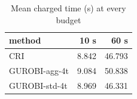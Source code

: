 \begin{table}[htbp]
\centering
\small
\caption{Mean charged time (s) at every budget}
\label{tab:E7_gurobi_threads_time_by_budget}
\begin{tabular}{lrr}
\toprule
method & 10 s & 60 s \\
\midrule
CRI & 8.842 & 46.793 \\
GUROBI-agg-4t & 9.084 & 50.838 \\
GUROBI-std-4t & 8.969 & 46.331 \\
\bottomrule
\end{tabular}
\end{table}
